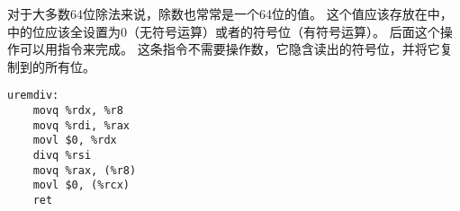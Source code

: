 {{        对于大多数64位除法来说，除数也常常是一个64位的值。
        这个值应该存放在中，中的位应该全设置为0（无符号运算）或者的符号位（有符号运算）。
        后面这个操作可以用指令来完成。
        这条指令不需要操作数，它隐含读出的符号位，并将它复制到的所有位。

        \begin{practicec}
            \begin{lstlisting}
uremdiv:
    movq %rdx, %r8
    movq %rdi, %rax
    movl $0, %rdx
    divq %rsi
    movq %rax, (%r8)
    movl $0, (%rcx)
    ret
            \end{lstlisting}
        \end{practicec}
    }
}
